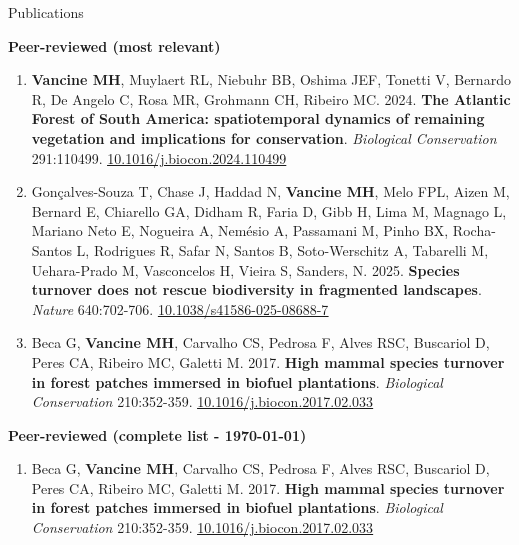 \documentclass{resume}
\begin{document}

\begin{rSection}{Publications}

{\bf Peer-reviewed (most relevant)}

\begin{enumerate} 

\item {\bf Vancine MH}, Muylaert RL, Niebuhr BB, Oshima JEF, Tonetti V, Bernardo R, De Angelo C, Rosa MR, Grohmann CH, Ribeiro MC. 2024. {\bf The Atlantic Forest of South America: spatiotemporal dynamics of remaining vegetation and implications for conservation}. {\it Biological Conservation} 291:110499. \href{https://doi.org/10.1016/j.biocon.2024.110499}{\underline{10.1016/j.biocon.2024.110499}}

\item Gonçalves-Souza T, Chase J, Haddad N, {\bf Vancine MH}, Melo FPL, Aizen M, Bernard E, Chiarello GA, Didham R, Faria D, Gibb H, Lima M, Magnago L, Mariano Neto E, Nogueira A, Nemésio A, Passamani M, Pinho BX, Rocha-Santos L, Rodrigues R, Safar N, Santos B, Soto-Werschitz A, Tabarelli M, Uehara-Prado M, Vasconcelos H, Vieira S, Sanders, N. 2025. {\bf Species turnover does not rescue biodiversity in fragmented landscapes}. {\it Nature} 640:702-706. \href{https://doi.org/10.1038/s41586-025-08688-7}{\underline{10.1038/s41586-025-08688-7}}

\item Beca G, {\bf Vancine MH}, Carvalho CS, Pedrosa F, Alves RSC, Buscariol D, Peres CA, Ribeiro MC, Galetti M. 2017. {\bf High mammal species turnover in forest patches immersed in biofuel plantations}. {\it Biological Conservation} 210:352-359. \href{https://doi.org/10.1016/j.biocon.2017.02.033}{\underline{10.1016/j.biocon.2017.02.033}}

\end{enumerate} 

{\bf Peer-reviewed (complete list - \today)}

\begin{enumerate} 
\item Beca G, {\bf Vancine MH}, Carvalho CS, Pedrosa F, Alves RSC, Buscariol D, Peres CA, Ribeiro MC, Galetti M. 2017. {\bf High mammal species turnover in forest patches immersed in biofuel plantations}. {\it Biological Conservation} 210:352-359. \href{https://doi.org/10.1016/j.biocon.2017.02.033}{\underline{10.1016/j.biocon.2017.02.033}}


\end{enumerate}
\end{rSection}
\end{document}
